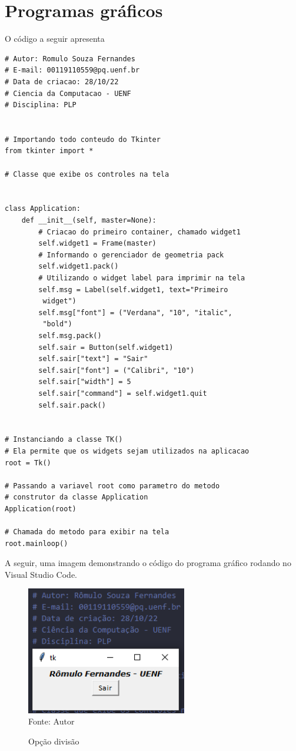     \section{Programas gr\'{a}ficos}
     O código a seguir apresenta
	\begin{lstlisting}
# Autor: Romulo Souza Fernandes
# E-mail: 00119110559@pq.uenf.br
# Data de criacao: 28/10/22
# Ciencia da Computacao - UENF
# Disciplina: PLP


# Importando todo conteudo do Tkinter
from tkinter import *

# Classe que exibe os controles na tela


class Application:
	def __init__(self, master=None):
		# Criacao do primeiro container, chamado widget1
		self.widget1 = Frame(master)
		# Informando o gerenciador de geometria pack
		self.widget1.pack()
		# Utilizando o widget label para imprimir na tela
		self.msg = Label(self.widget1, text="Primeiro
		 widget")
		self.msg["font"] = ("Verdana", "10", "italic",
		 "bold")
		self.msg.pack()
		self.sair = Button(self.widget1)
		self.sair["text"] = "Sair"
		self.sair["font"] = ("Calibri", "10")
		self.sair["width"] = 5
		self.sair["command"] = self.widget1.quit
		self.sair.pack()


# Instanciando a classe TK()
# Ela permite que os widgets sejam utilizados na aplicacao
root = Tk()

# Passando a variavel root como parametro do metodo
# construtor da classe Application
Application(root)

# Chamada do metodo para exibir na tela
root.mainloop()
	\end{lstlisting}
	A seguir, uma imagem demonstrando o código do programa gráfico rodando no Visual Studio Code.
	
	\begin{figure}[H]
		\begin{center}
			\caption{Opção divisão} \label{ling1}
			\includegraphics[width=7cm]{grafico.PNG} \\
			{\tiny \sf Fonte:{ Autor}}
		\end{center}
	\end{figure}

